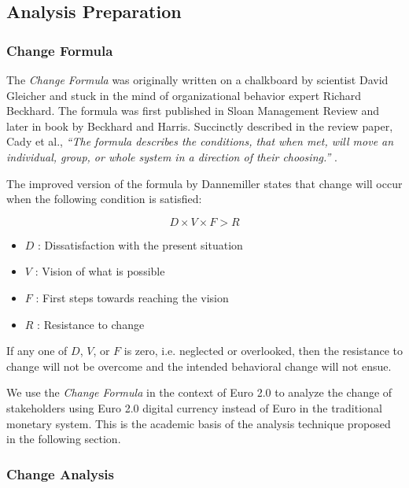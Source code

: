 \documentclass[a4paper,12pt]{article} %
\begin{document}
{\subsection{Analysis Preparation} \label{ssec:4.2}

\subsubsection{Change Formula} \label{sssec:4.2:changeFormula}
The \textit{Change Formula} was originally written on a chalkboard by scientist David Gleicher and stuck in the mind of organizational behavior expert Richard Beckhard\cite{changeFormula2014}. The formula was first published in Sloan Management Review\cite{beckhard1975} and later in book by Beckhard and Harris\cite{organizationalTransitions1977}. Succinctly described in the review paper, Cady et al., \textit{``The formula describes the conditions, that when met, will move an individual, group, or whole system in a direction of their choosing.''} \cite{changeFormula2014}.

The improved version of the formula by Dannemiller\cite{dannemiller1992} states that change will occur when the following condition is satisfied:

\begin{equation}
	D \times V \times F > R
\end{equation}

\begin{itemize}
	\item $D$ : Dissatisfaction with the present situation
	\item $V$ : Vision of what is possible
	\item $F$ : First steps towards reaching the vision
	\item $R$ : Resistance to change
\end{itemize}

If any one of $D$, $V$, or $F$ is zero, i.e. neglected or overlooked, then the resistance to change will not be overcome and the intended behavioral change will not ensue.

We use the \textit{Change Formula} in the context of Euro 2.0 to analyze the change of stakeholders using Euro 2.0 digital currency instead of Euro in the traditional monetary system. This is the academic basis of the analysis technique proposed in the following section.

\subsubsection{Change Analysis} \label{sssec:4.2:changeAnalysis}

}
\end{document}
